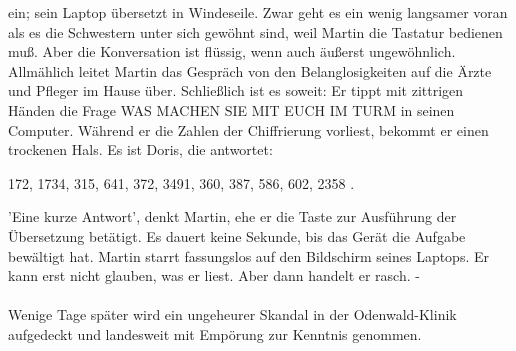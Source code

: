 ein; sein Laptop \"ubersetzt in Windeseile. Zwar geht es ein wenig langsamer
voran als es die Schwestern unter sich gew\"ohnt sind, weil Martin die
Tastatur bedienen mu{\ss}. Aber die Konversation ist fl\"ussig, wenn auch
\"au{\ss}erst ungew\"ohnlich. \\
Allm\"ahlich leitet Martin das Gespr\"ach von den Belanglosigkeiten auf die
\"Arzte und Pfleger im Hause \"uber. Schlie{\ss}lich ist es soweit: Er tippt
mit zittrigen H\"anden die Frage WAS MACHEN SIE MIT EUCH IM TURM in seinen
Computer. W\"ahrend er die Zahlen der Chiffrierung vorliest, bekommt er einen
trockenen Hals. Es ist Doris, die antwortet:
\begin{center}
172, 1734, 315, 641, 372, 3491, 360, 387, 586, 602, 2358\,\,.
\end{center}
'Eine kurze Antwort', denkt Martin, ehe er die Taste zur Ausf\"uhrung der
\"Ubersetzung bet\"atigt. Es dauert keine Sekunde, bis das Ger\"at die Aufgabe
bew\"altigt hat. Martin starrt fassungslos auf den Bildschirm seines Laptops.
Er kann erst nicht glauben, was er liest. Aber dann handelt er rasch. - \\ \\
Wenige Tage sp\"ater wird ein ungeheurer Skandal in der Odenwald-Klinik
aufgedeckt und landesweit mit Emp\"orung zur Kenntnis genommen.  

